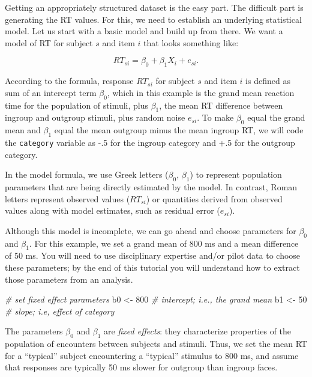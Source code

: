 \documentclass[english,doc,floatsintext]{apa6}
\newenvironment{Shaded}{\begin{snugshade}}{\end{snugshade}}
\newcommand{\CommentTok}[1]{\textcolor[rgb]{0.56,0.35,0.01}{\textit{#1}}}
\newcommand{\DecValTok}[1]{\textcolor[rgb]{0.00,0.00,0.81}{#1}}
\newcommand{\NormalTok}[1]{#1}
\newcommand{\StringTok}[1]{\textcolor[rgb]{0.31,0.60,0.02}{#1}}
\begin{document}
Getting an appropriately structured dataset is the easy part. The difficult part is generating the RT values. For this, we need to establish an underlying statistical model. Let us start with a basic model and build up from there. We want a model of RT for subject \(s\) and item \(i\) that looks something like:

\begin{equation}
RT_{si} = \beta_0 + \beta_1 X_{i} + e_{si}.
\end{equation}

\noindent According to the formula, response \(RT_{si}\) for subject \(s\) and item \(i\) is defined as sum of an intercept term \(\beta_0\), which in this example is the grand mean reaction time for the population of stimuli, plus \(\beta_1\), the mean RT difference between ingroup and outgroup stimuli, plus random noise \(e_{si}\). To make \(\beta_0\) equal the grand mean and \(\beta_1\) equal the mean outgroup minus the mean ingroup RT, we will code the \texttt{category} variable as -.5 for the ingroup category and +.5 for the outgroup category.

In the model formula, we use Greek letters (\(\beta_0\), \(\beta_1\)) to represent population parameters that are being directly estimated by the model. In contrast, Roman letters represent observed values (\(RT_{si}\)) or quantities derived from observed values along with model estimates, such as residual error (\(e_{si}\)).

Although this model is incomplete, we can go ahead and choose parameters for \(\beta_0\) and \(\beta_1\). For this example, we set a grand mean of 800 ms and a mean difference of 50 ms. You will need to use disciplinary expertise and/or pilot data to choose these parameters; by the end of this tutorial you will understand how to extract those parameters from an analysis.

\begin{Shaded}
\begin{Highlighting}[]
\CommentTok{# set fixed effect parameters}
\NormalTok{b0 <-}\StringTok{ }\DecValTok{800} \CommentTok{# intercept; i.e., the grand mean}
\NormalTok{b1 <-}\StringTok{  }\DecValTok{50} \CommentTok{# slope; i.e, effect of category}
\end{Highlighting}
\end{Shaded}

\noindent The parameters \(\beta_0\) and \(\beta_1\) are \emph{fixed effects}: they characterize properties of the population of encounters between subjects and stimuli. Thus, we set the mean RT for a \enquote{typical} subject encountering a \enquote{typical} stimulus to 800 ms, and assume that responses are typically 50 ms slower for outgroup than ingroup faces.
\end{document}
